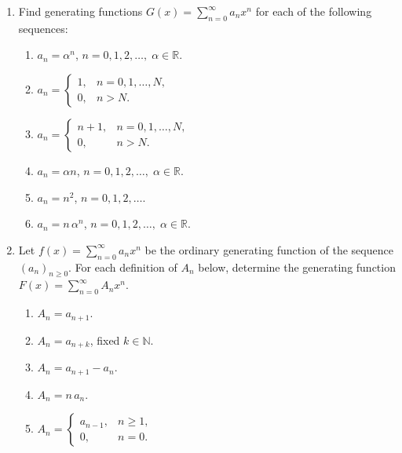 \documentclass[docmute]{article}
\begin{document}
\begin{enumerate}[label=\textbf{\arabic*.}]
  \item Find generating functions $G(x)=\sum_{n=0}^{\infty} a_{n}x^{n}$ for each
        of the following sequences:
        \begin{enumerate}[label=(\alph*)]
          \item $a_n=\alpha^{n}$,  \quad $n=0,1,2,\dots,\; \alpha\in\mathbb R$.
          \item $\displaystyle   a_n =
            \begin{cases}
              1, & n=0,1,\dots,N,\\
              0, & n>N.
            \end{cases}$
          \item $\displaystyle   a_n =
            \begin{cases}
              n+1, & n=0,1,\dots,N,\\
              0,   & n>N.
            \end{cases}$
          \item $a_n=\alpha n$, \quad $n=0,1,2,\dots,\; \alpha\in\mathbb R$.
          \item $a_n=n^{2}$, \quad $n=0,1,2,\dots$.
          \item $a_n=n\,\alpha^{n}$, \quad $n=0,1,2,\dots,\; \alpha\in\mathbb R$.
        \end{enumerate}

  \item Let $f(x)=\sum_{n=0}^{\infty} a_{n}x^{n}$ be the ordinary generating
        function of the sequence $(a_{n})_{n\ge0}$.  For each definition of
        $A_{n}$ below, determine the generating function
        $F(x)=\sum_{n=0}^{\infty} A_{n}x^{n}$.
        \begin{enumerate}[label=(\alph*)]
          \item $A_n=a_{n+1}$.
          \item $A_n=a_{n+k}$, \;fixed $k\in\mathbb N$.
          \item $A_n=a_{n+1}-a_n$.
          \item $A_n=n\,a_n$.
          \item $\displaystyle A_n=
            \begin{cases}
              a_{n-1}, & n\ge1,\\
              0, & n=0.
            \end{cases}$
        \end{enumerate}
\end{enumerate}
\end{document}

